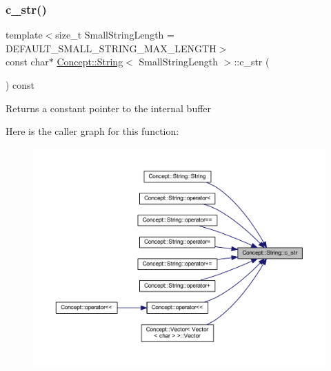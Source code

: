 \subsubsection{\texorpdfstring{c\_str()}{c\_str()}}
{\footnotesize\ttfamily template$<$size\+\_\+t Small\+String\+Length = D\+E\+F\+A\+U\+L\+T\+\_\+\+S\+M\+A\+L\+L\+\_\+\+S\+T\+R\+I\+N\+G\+\_\+\+M\+A\+X\+\_\+\+L\+E\+N\+G\+TH$>$ \\
const char$\ast$ \mbox{\hyperlink{class_concept_1_1_string}{Concept\+::\+String}}$<$ Small\+String\+Length $>$\+::c\+\_\+str (\begin{DoxyParamCaption}{ }\end{DoxyParamCaption}) const\hspace{0.3cm}{\ttfamily [inline]}}

\begin{DoxyReturn}{Returns}
a constant pointer to the internal buffer 
\end{DoxyReturn}
Here is the caller graph for this function\+:\nopagebreak
\begin{figure}[H]
\begin{center}
\leavevmode
\includegraphics[width=350pt]{class_concept_1_1_string_ae7fb4fa9bc119158939fea1ff0496e02_icgraph}
\end{center}
\end{figure}
\mbox{\label{class_concept_1_1_string_a3224cd035b9e0d9f3bdaa4cff8fcbc0f}} 
